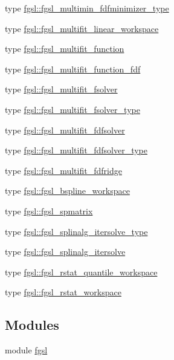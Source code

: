 \begin{DoxyCompactItemize}
type \hyperlink{structfgsl_1_1fgsl__multimin__fdfminimizer__type}{fgsl\+::fgsl\+\_\+multimin\+\_\+fdfminimizer\+\_\+type}
\item 
type \hyperlink{structfgsl_1_1fgsl__multifit__linear__workspace}{fgsl\+::fgsl\+\_\+multifit\+\_\+linear\+\_\+workspace}
\item 
type \hyperlink{structfgsl_1_1fgsl__multifit__function}{fgsl\+::fgsl\+\_\+multifit\+\_\+function}
\item 
type \hyperlink{structfgsl_1_1fgsl__multifit__function__fdf}{fgsl\+::fgsl\+\_\+multifit\+\_\+function\+\_\+fdf}
\item 
type \hyperlink{structfgsl_1_1fgsl__multifit__fsolver}{fgsl\+::fgsl\+\_\+multifit\+\_\+fsolver}
\item 
type \hyperlink{structfgsl_1_1fgsl__multifit__fsolver__type}{fgsl\+::fgsl\+\_\+multifit\+\_\+fsolver\+\_\+type}
\item 
type \hyperlink{structfgsl_1_1fgsl__multifit__fdfsolver}{fgsl\+::fgsl\+\_\+multifit\+\_\+fdfsolver}
\item 
type \hyperlink{structfgsl_1_1fgsl__multifit__fdfsolver__type}{fgsl\+::fgsl\+\_\+multifit\+\_\+fdfsolver\+\_\+type}
\item 
type \hyperlink{structfgsl_1_1fgsl__multifit__fdfridge}{fgsl\+::fgsl\+\_\+multifit\+\_\+fdfridge}
\item 
type \hyperlink{structfgsl_1_1fgsl__bspline__workspace}{fgsl\+::fgsl\+\_\+bspline\+\_\+workspace}
\item 
type \hyperlink{structfgsl_1_1fgsl__spmatrix}{fgsl\+::fgsl\+\_\+spmatrix}
\item 
type \hyperlink{structfgsl_1_1fgsl__splinalg__itersolve__type}{fgsl\+::fgsl\+\_\+splinalg\+\_\+itersolve\+\_\+type}
\item 
type \hyperlink{structfgsl_1_1fgsl__splinalg__itersolve}{fgsl\+::fgsl\+\_\+splinalg\+\_\+itersolve}
\item 
type \hyperlink{structfgsl_1_1fgsl__rstat__quantile__workspace}{fgsl\+::fgsl\+\_\+rstat\+\_\+quantile\+\_\+workspace}
\item 
type \hyperlink{structfgsl_1_1fgsl__rstat__workspace}{fgsl\+::fgsl\+\_\+rstat\+\_\+workspace}
\end{DoxyCompactItemize}
\subsection*{Modules}
\begin{DoxyCompactItemize}
\item 
module \hyperlink{namespacefgsl}{fgsl}
\end{DoxyCompactItemize}
